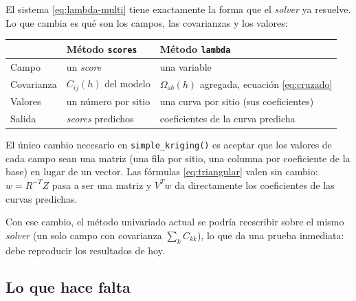 \documentclass[11pt,a4paper]{article}
\newcommand{\code}[1]{\texttt{#1}}
\begin{document}
El sistema \eqref{eq:lambda-multi} tiene exactamente la forma que el
\emph{solver} ya resuelve. Lo que cambia es qué son los campos, las
covarianzas y los valores:

\begin{center}
\begin{tabular}{lll}
\hline
 & Método \code{scores} & Método \code{lambda} \\
\hline
Campo & un \emph{score} & una variable \\
Covarianza & $C_{ij}(h)$ del modelo & $\Omega_{ab}(h)$ agregada, ecuación \eqref{eq:cruzado} \\
Valores & un número por sitio & una curva por sitio (sus coeficientes) \\
Salida & \emph{scores} predichos & coeficientes de la curva predicha \\
\hline
\end{tabular}
\end{center}

El único cambio necesario en \code{simple\_kriging()} es aceptar que los
valores de cada campo sean una matriz (una fila por sitio, una columna por
coeficiente de la base) en lugar de un vector. Las fórmulas
\eqref{eq:triangular} valen sin cambio: $w = R^{-T} Z$ pasa a ser una matriz
y $V^{T} w$ da directamente los coeficientes de las curvas predichas.

Con ese cambio, el método univariado actual se podría reescribir sobre el
mismo \emph{solver} (un solo campo con covarianza $\sum_k C_{kk}$), lo que da
una prueba inmediata: debe reproducir los resultados de hoy.

\subsection{Lo que hace falta}
\end{document}
